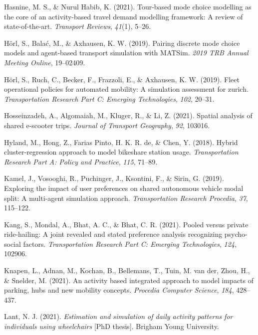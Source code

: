 \documentclass[fancy, masters]{byuthesis}
\newlength{\cslhangindent}
\newlength{\cslentryspacingunit} %
\newenvironment{CSLReferences}[2] %
 {%
  \setlength{\parindent}{0pt}
  \ifodd #1
  \let\oldpar\par
  \def\par{\hangindent=\cslhangindent\oldpar}
  \fi
  \setlength{\parskip}{#2\cslentryspacingunit}
 }%
 {}
\begin{document}
\begin{CSLReferences}{1}{0}
\leavevmode{}%
Hasnine, M. S., \& Nurul Habib, K. (2021). Tour-based mode choice modelling as the core of an activity-based travel demand modelling framework: A review of state-of-the-art. \emph{Transport Reviews}, \emph{41}(1), 5--26.

\leavevmode{}%
Hörl, S., Balać, M., \& Axhausen, K. W. (2019). Pairing discrete mode choice models and agent-based transport simulation with MATSim. \emph{2019 TRB Annual Meeting Online}, 19--02409.

\leavevmode{}%
Hörl, S., Ruch, C., Becker, F., Frazzoli, E., \& Axhausen, K. W. (2019). Fleet operational policies for automated mobility: A simulation assessment for zurich. \emph{Transportation Research Part C: Emerging Technologies}, \emph{102}, 20--31.

\leavevmode{}%
Hosseinzadeh, A., Algomaiah, M., Kluger, R., \& Li, Z. (2021). Spatial analysis of shared e-scooter trips. \emph{Journal of Transport Geography}, \emph{92}, 103016.

\leavevmode{}%
Hyland, M., Hong, Z., Farias Pinto, H. K. R. de, \& Chen, Y. (2018). Hybrid cluster-regression approach to model bikeshare station usage. \emph{Transportation Research Part A: Policy and Practice}, \emph{115}, 71--89.

\leavevmode{}%
Kamel, J., Vosooghi, R., Puchinger, J., Ksontini, F., \& Sirin, G. (2019). Exploring the impact of user preferences on shared autonomous vehicle modal split: A multi-agent simulation approach. \emph{Transportation Research Procedia}, \emph{37}, 115--122.

\leavevmode{}%
Kang, S., Mondal, A., Bhat, A. C., \& Bhat, C. R. (2021). Pooled versus private ride-hailing: A joint revealed and stated preference analysis recognizing psycho-social factors. \emph{Transportation Research Part C: Emerging Technologies}, \emph{124}, 102906.

\leavevmode{}%
Knapen, L., Adnan, M., Kochan, B., Bellemans, T., Tuin, M. van der, Zhou, H., \& Snelder, M. (2021). An activity based integrated approach to model impacts of parking, hubs and new mobility concepts. \emph{Procedia Computer Science}, \emph{184}, 428--437.

\leavevmode{}%
Lant, N. J. (2021). \emph{Estimation and simulation of daily activity patterns for individuals using wheelchairs} {[}PhD thesis{]}. Brigham Young University.


\end{CSLReferences}
\end{document}

